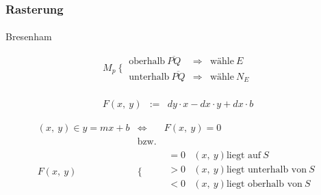 \documentclass{beamer}
\begin{document}
\begin{frame}
    \frametitle{Rasterung}
\framesubtitle{}

\begin{block}{Bresenham}

    \begin{equation*}
        M_p ~\Big\{~ \begin{matrix}
            \textrm{oberhalb}~ \overline{PQ} &\Rightarrow& \textrm{wähle}~ E \\ 
            \textrm{unterhalb}~ \overline{PQ} &\Rightarrow& \textrm{wähle}~ N_E 
        \end{matrix}
    \end{equation*}\\
  
    \begin{equation*}\begin{matrix}
        F\left(x,~ y\right) & := & dy \cdot x - dx \cdot y + dx \cdot b 
    \end{matrix}\end{equation*}

\begin{equation*}
\begin{matrix}
        (x,~ y) \in y = mx + b & \Leftrightarrow & F\left(x,~ y\right) = 0 \\
        & \textrm{bzw.} & \\
        F\left(x,~ y\right) & \Bigg\{ & \begin{matrix}
            = 0 & \left(x,~ y\right) \textrm{liegt auf}~ S \\
            > 0 & \left(x,~ y\right) \textrm{liegt unterhalb von}~ S \\
            < 0 & \left(x,~ y\right) \textrm{liegt oberhalb von}~ S \\
        \end{matrix}
    \end{matrix}\end{equation*}
   \end{block}
\end{frame}
\end{document}
